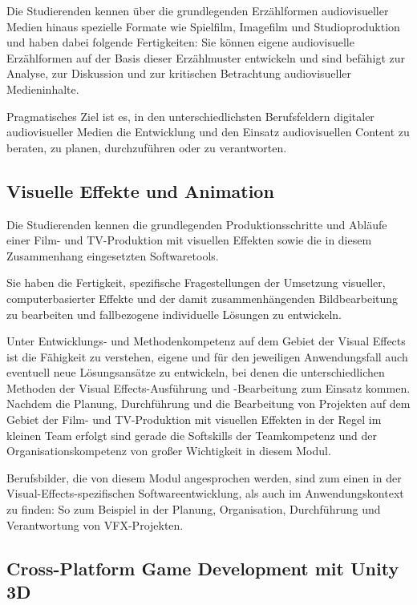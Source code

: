 Die Studierenden kennen über die grundlegenden Erzählformen
audiovisueller Medien hinaus spezielle Formate wie Spielfilm, Imagefilm
und Studioproduktion und haben dabei folgende Fertigkeiten: Sie können
eigene audiovisuelle Erzählformen auf der Basis dieser Erzählmuster
entwickeln und sind befähigt zur Analyse, zur Diskussion und zur
kritischen Betrachtung audiovisueller Medieninhalte.

Pragmatisches Ziel ist es, in den unterschiedlichsten Berufsfeldern
digitaler audiovisueller Medien die Entwicklung und den Einsatz
audiovisuellen Content zu beraten, zu planen, durchzuführen oder zu
verantworten.

\subsection{Visuelle Effekte und
Animation}\label{visuelle-effekte-und-animation}

Die Studierenden kennen die grundlegenden Produktionsschritte und
Abläufe einer Film- und TV-Produktion mit visuellen Effekten sowie die
in diesem Zusammenhang eingesetzten Softwaretools.

Sie haben die Fertigkeit, spezifische Fragestellungen der Umsetzung
visueller, computerbasierter Effekte und der damit zusammenhängenden
Bildbearbeitung zu bearbeiten und fallbezogene individuelle Lösungen zu
entwickeln.

Unter Entwicklungs- und Methodenkompetenz auf dem Gebiet der Visual
Effects ist die Fähigkeit zu verstehen, eigene und für den jeweiligen
Anwendungsfall auch eventuell neue Lösungsansätze zu entwickeln, bei
denen die unterschiedlichen Methoden der Visual Effects-Ausführung und
-Bearbeitung zum Einsatz kommen. Nachdem die Planung, Durchführung und
die Bearbeitung von Projekten auf dem Gebiet der Film- und TV-Produktion
mit visuellen Effekten in der Regel im kleinen Team erfolgt sind gerade
die Softskills der Teamkompetenz und der Organisationskompetenz von
großer Wichtigkeit in diesem Modul.

Berufsbilder, die von diesem Modul angesprochen werden, sind zum einen
in der Visual-Effects-spezifischen Softwareentwicklung, als auch im
Anwendungskontext zu finden: So zum Beispiel in der Planung,
Organisation, Durchführung und Verantwortung von VFX-Projekten.

\subsection{Cross-Platform Game Development mit Unity
3D}\label{cross-platform-game-development-mit-unity-3d}

